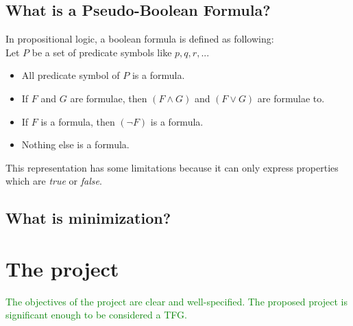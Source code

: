 \subsection{What is a Pseudo-Boolean Formula?}
In propositional logic, a boolean formula is defined as following\cite{Lpo}:\\
Let $P$ be a set of predicate symbols like $p,q,r,...$
\begin{itemize}
	\item All predicate symbol of $P$ is a formula.
	\item If $F$ and $G$ are formulae, then $(F \land G)$ and $(F \lor G)$ are formulae to.
	\item If $F$ is a formula, then $(\neg F)$ is a formula.
	\item Nothing else is a formula.
\end{itemize}
This representation has some limitations because it can only express properties which are \emph{true} or \emph{false}.\\


\subsection{What is minimization?}


%
%
%

\section{The project}
\textcolor{green}{The objectives of the project are
	clear and well-specified. The
	proposed project is significant
	enough to be considered a TFG.
	\\
	\\}

